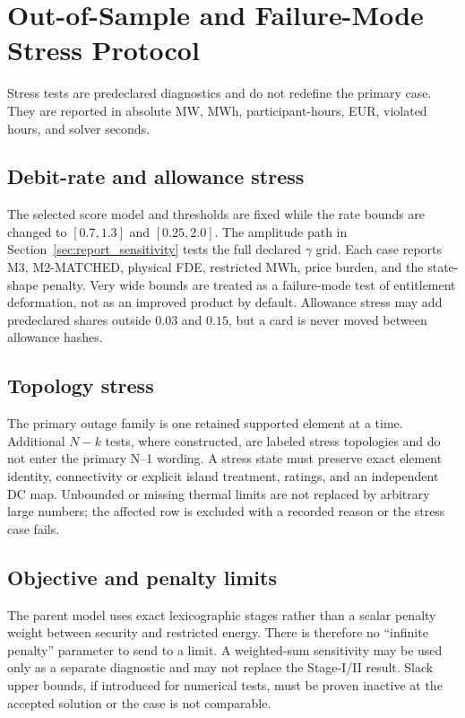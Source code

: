 \documentclass[10pt,journal,onecolumn]{IEEEtran}
\begin{document}
\section{Out-of-Sample and Failure-Mode Stress Protocol}
\label{sec:report_stress}

Stress tests are predeclared diagnostics and do not redefine the primary case.
They are reported in absolute MW, MWh, participant-hours, EUR, violated hours,
and solver seconds.

\subsection{Debit-rate and allowance stress}
The selected score model and thresholds are fixed while the rate bounds are
changed to $[0.7,1.3]$ and $[0.25,2.0]$. The amplitude path in
Section~\ref{sec:report_sensitivity} tests the full declared $\gamma$ grid. Each
case reports M3, M2-MATCHED, physical FDE, restricted MWh, price burden, and the
state-shape penalty. Very wide bounds are treated as a failure-mode test of
entitlement deformation, not as an improved product by default. Allowance stress
may add predeclared shares outside $0.03$ and $0.15$, but a card is never moved
between allowance hashes.

\subsection{Topology stress}
The primary outage family is one retained supported element at a time. Additional
$N-k$ tests, where constructed, are labeled stress topologies and do not enter
the primary N--1 wording. A stress state must preserve exact element identity,
connectivity or explicit island treatment, ratings, and an independent DC map.
Unbounded or missing thermal limits are not replaced by arbitrary large numbers;
the affected row is excluded with a recorded reason or the stress case fails.

\subsection{Objective and penalty limits}
The parent model uses exact lexicographic stages rather than a scalar penalty
weight between security and restricted energy. There is therefore no
``infinite penalty'' parameter to send to a limit. A weighted-sum sensitivity
may be used only as a separate diagnostic and may not replace the Stage-I/II
result. Slack upper bounds, if introduced for numerical tests, must be proven
inactive at the accepted solution or the case is not comparable.
\end{document}
